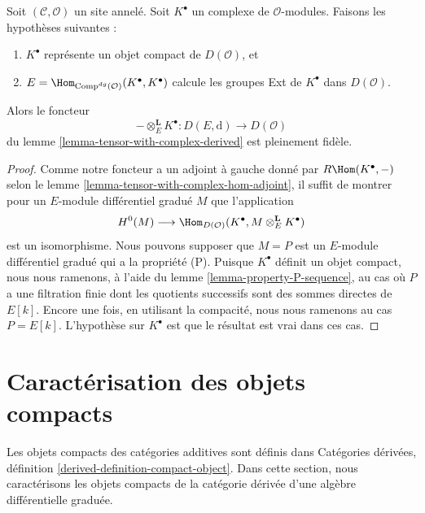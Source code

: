 \begin{lemma}
\label{lemma-fully-faithful-in-compact-case}
Soit $(\mathcal{C}, \mathcal{O})$ un site annelé. Soit
$K^\bullet$ un complexe de $\mathcal{O}$-modules. Faisons les hypothèses
suivantes :
\begin{enumerate}
\item $K^\bullet$ représente un objet compact de $D(\mathcal{O})$, et
\item $E = \Hom_{\text{Comp}^{dg}(\mathcal{O})}(K^\bullet, K^\bullet)$
calcule les groupes Ext de $K^\bullet$ dans $D(\mathcal{O})$.
\end{enumerate}
Alors le foncteur
$$
- \otimes_E^\mathbf{L} K^\bullet :
D(E, \text{d})
\longrightarrow
D(\mathcal{O})
$$
du lemme \ref{lemma-tensor-with-complex-derived} est pleinement fidèle.
\end{lemma}

\begin{proof}
Comme notre foncteur a un adjoint à gauche donné par
$R\Hom(K^\bullet, -)$ selon le lemme \ref{lemma-tensor-with-complex-hom-adjoint},
il suffit de montrer pour un $E$-module différentiel gradué $M$ que l'application
$$
H^0(M) \longrightarrow
\Hom_{D(\mathcal{O})}(K^\bullet, M \otimes_E^\mathbf{L} K^\bullet)
$$
est un isomorphisme. Nous pouvons supposer que $M = P$ est un $E$-module
différentiel gradué qui a la propriété (P). Puisque $K^\bullet$ définit un objet
compact, nous nous ramenons, à l'aide du
lemme \ref{lemma-property-P-sequence}, au
cas où $P$ a une filtration finie dont les quotients successifs sont des sommes
directes de $E[k]$. Encore une fois, en utilisant la compacité, nous
nous ramenons au cas $P = E[k]$. L'hypothèse sur $K^\bullet$ est que le
résultat est vrai dans ces cas.
\end{proof}











\section{Caractérisation des objets compacts}
\label{section-compact}

\noindent
Les objets compacts des catégories additives sont définis
dans Catégories dérivées, définition \ref{derived-definition-compact-object}. Dans
cette section, nous caractérisons les objets compacts de la catégorie
dérivée d'une algèbre différentielle graduée.

